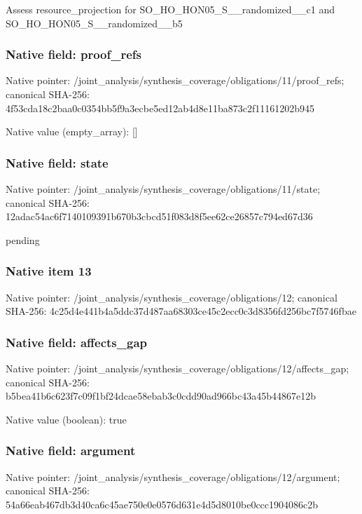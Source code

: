 \documentclass[10pt,a4paper]{article}
\begin{document}
\begingroup\raggedright\sloppy Assess resource\_\allowbreak{}projection for SO\_\allowbreak{}HO\_\allowbreak{}HON05\_\allowbreak{}S\_\allowbreak{}\_\allowbreak{}randomized\_\allowbreak{}\_\allowbreak{}c1 and SO\_\allowbreak{}HO\_\allowbreak{}HON05\_\allowbreak{}S\_\allowbreak{}\_\allowbreak{}randomized\_\allowbreak{}\_\allowbreak{}b5\par\endgroup

\subsubsection{Native field: proof\_\allowbreak{}refs}
Native pointer: /joint\_\allowbreak{}analysis/synthesis\_\allowbreak{}coverage/obligations/11/proof\_\allowbreak{}refs; canonical SHA-256: 4f53cda18c2baa0c0354bb5f9a3ecbe5ed12ab4d8e11ba873c2f11161202b945

Native value (empty\_\allowbreak{}array): []

\subsubsection{Native field: state}
Native pointer: /joint\_\allowbreak{}analysis/synthesis\_\allowbreak{}coverage/obligations/11/state; canonical SHA-256: 12adac54ac6f7140109391b670b3cbcd51f083d8f5ee62ce26857c794ed67d36

\begingroup\raggedright\sloppy pending\par\endgroup

\subsubsection{Native item 13}
Native pointer: /joint\_\allowbreak{}analysis/synthesis\_\allowbreak{}coverage/obligations/12; canonical SHA-256: 4c25d4e441b4a5ddc37d487aa68303ce45c2ecc0c3d8356fd256bc7f5746fbae

\subsubsection{Native field: affects\_\allowbreak{}gap}
Native pointer: /joint\_\allowbreak{}analysis/synthesis\_\allowbreak{}coverage/obligations/12/affects\_\allowbreak{}gap; canonical SHA-256: b5bea41b6c623f7c09f1bf24dcae58ebab3c0cdd90ad966bc43a45b44867e12b

Native value (boolean): true

\subsubsection{Native field: argument}
Native pointer: /joint\_\allowbreak{}analysis/synthesis\_\allowbreak{}coverage/obligations/12/argument; canonical SHA-256: 54a66eab467db3d40ca6c45ae750e0e0576d631e4d5d8010be0ccc1904086c2b
\end{document}
